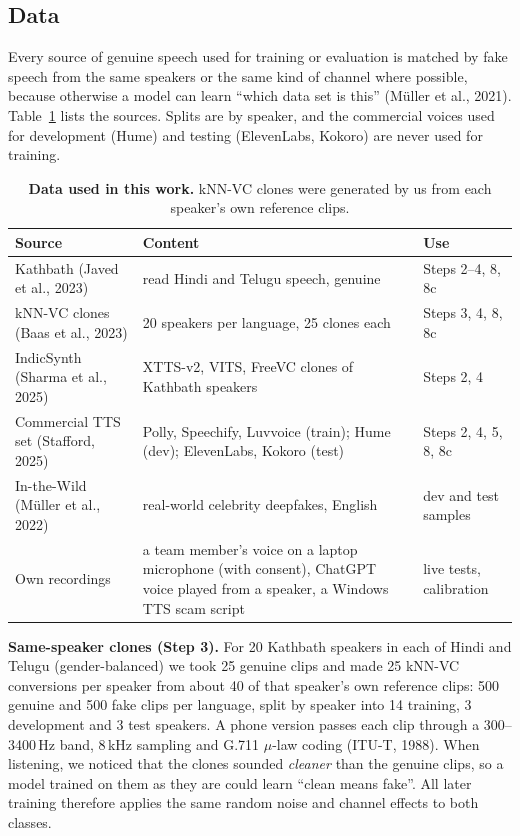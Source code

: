 \documentclass[10pt,a4paper,twocolumn]{article}
\begin{document}
\subsection{Data}
Every source of genuine speech used for training or evaluation is matched by fake speech from the same speakers or the same kind of channel where possible, because otherwise a model can learn ``which data set is this'' (M\"uller et al., 2021). Table~\ref{tab:data} lists the sources. Splits are by speaker, and the commercial voices used for development (Hume) and testing (ElevenLabs, Kokoro) are never used for training.

\begin{table}[t]
\centering\footnotesize
\caption{\textbf{Data used in this work.} kNN-VC clones were generated by us from each speaker's own reference clips.}
\label{tab:data}
\begin{tabular}{@{}p{}p{}p{}@{}}
\toprule
\textbf{Source} & \textbf{Content} & \textbf{Use}\\
\midrule
Kathbath (Javed et al., 2023) & read Hindi and Telugu speech, genuine & Steps 2--4, 8, 8c\\
kNN-VC clones (Baas et al., 2023) & 20 speakers per language, 25 clones each & Steps 3, 4, 8, 8c\\
IndicSynth (Sharma et al., 2025) & XTTS-v2, VITS, FreeVC clones of Kathbath speakers & Steps 2, 4\\
Commercial TTS set (Stafford, 2025) & Polly, Speechify, Luvvoice (train); Hume (dev); ElevenLabs, Kokoro (test) & Steps 2, 4, 5, 8, 8c\\
In-the-Wild (M\"uller et al., 2022) & real-world celebrity deepfakes, English & dev and test samples\\
Own recordings & a team member's voice on a laptop microphone (with consent), ChatGPT voice played from a speaker, a Windows TTS scam script & live tests, calibration\\
\bottomrule
\end{tabular}
\end{table}

\textbf{Same-speaker clones (Step 3).} For 20 Kathbath speakers in each of Hindi and Telugu (gender-balanced) we took 25 genuine clips and made 25 kNN-VC conversions per speaker from about 40 of that speaker's own reference clips: 500 genuine and 500 fake clips per language, split by speaker into 14 training, 3 development and 3 test speakers. A phone version passes each clip through a 300--3400\,Hz band, 8\,kHz sampling and G.711 $\mu$-law coding (ITU-T, 1988). When listening, we noticed that the clones sounded \emph{cleaner} than the genuine clips, so a model trained on them as they are could learn ``clean means fake''. All later training therefore applies the same random noise and channel effects to both classes.
\end{document}
